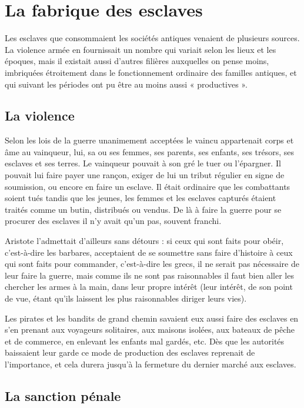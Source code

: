 \section{La fabrique des esclaves}

Les esclaves que consommaient les sociétés antiques venaient de
plusieurs sources. La violence armée en fournissait un nombre qui variait
selon les lieux et les époques, mais il existait aussi d'autres filières auxquelles
on pense moins, imbriquées étroitement dans le fonctionnement
ordinaire des familles antiques, et qui suivant les périodes ont pu être au
moins aussi « productives ».

\subsection{La violence}

Selon les lois de la guerre unanimement acceptées le vaincu appartenait
corps et âme au vainqueur, lui, sa ou ses femmes, ses parents, ses
enfants, ses trésors, ses esclaves et ses terres. Le vainqueur pouvait à son
gré le tuer ou l'épargner. Il pouvait lui faire payer une rançon, exiger de
lui un tribut régulier en signe de soumission, ou encore en faire un esclave.
Il était ordinaire que les combattants soient tués tandis que les jeunes,
les femmes et les esclaves capturés étaient traités comme un butin, distribués
ou vendus. De là à faire la guerre pour se procurer des esclaves il
n'y avait qu'un pas, souvent franchi.

Aristote l'admettait d'ailleurs sans détours : si ceux qui sont faits
pour obéir, c'est-à-dire les barbares, acceptaient de se soumettre sans faire
d'histoire à ceux qui sont faits pour commander, c'est-à-dire les grecs,
il ne serait pas nécessaire de leur faire la guerre, mais comme ils ne sont
pas raisonnables il faut bien aller les chercher les armes à la main, dans
leur propre intérêt (leur intérêt, de son point de vue, étant qu'ils laissent
les plus raisonnables diriger leurs vies).

Les pirates et les bandits de grand chemin savaient eux aussi faire
des esclaves en s'en prenant aux voyageurs solitaires, aux maisons isolées,
aux bateaux de pêche et de commerce, en enlevant les enfants mal
gardés, etc. Dès que les autorités baissaient leur garde ce mode de production
des esclaves reprenait de l'importance, et cela durera jusqu'à la
fermeture du dernier marché aux esclaves.

\subsection{La sanction pénale}

